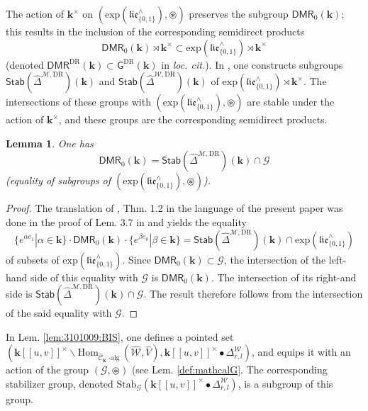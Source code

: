 \documentclass[10pt]{amsart}
\newcommand{\DR}{\mathrm{DR}}
\newtheorem{lem}[thm]{Lemma}
\numberwithin{equation}{subsection}
\begin{document}
The action of $\mathbf k^\times$ on $(\mathrm{exp}(\mathfrak{lie}_{\{0,1\}}^\wedge),\circledast)$
preserves the subgroup $\mathsf{DMR}_0(\mathbf k)$; this results in the inclusion of the corresponding 
semidirect products
$$
\mathsf{DMR}_0(\mathbf k)\rtimes\mathbf k^\times
\subset \mathrm{exp}(\mathfrak{lie}_{\{0,1\}}^\wedge)
\rtimes\mathbf k^\times
$$
(denoted $\mathsf{DMR}^\DR(\mathbf k)\subset \mathsf G^\DR(\mathbf k)$ in {\it loc. cit.}). 
In \cite{EF2}, one constructs subgroups 
$\mathsf{Stab}(\hat\Delta^{\mathcal M,\DR})(\mathbf k)$ and $\mathsf{Stab}(\hat\Delta^{\mathcal W,\DR})(\mathbf k)$ 
of $\mathrm{exp}(\mathfrak{lie}_{\{0,1\}}^\wedge)\rtimes\mathbf k^\times$. The intersections 
of these groups with $(\mathrm{exp}(\mathfrak{lie}_{\{0,1\}}^\wedge),\circledast)$ are stable under the action of 
$\mathbf k^\times$, and
these groups are the corresponding semidirect products. 

\begin{lem}\label{lem:12:2209}
One has 
$$
\mathsf{DMR}_0(\mathbf k)=\mathsf{Stab}(\hat\Delta^{\mathcal M,\DR})(\mathbf k)\cap \mathcal G
$$
(equality of subgroups of $(\mathrm{exp}(\mathfrak{lie}_{\{0,1\}}^\wedge),\circledast)$). 
\end{lem}

\begin{proof}
The translation of \cite{EF0}, Thm. 1.2 in the language of the present paper was done in the proof of 
Lem. 3.7 in \cite{EF2} and yields the equality 
$$
\{e^{\alpha e_1}|\alpha\in\mathbf k\}\cdot\mathsf{DMR}_0(\mathbf k)\cdot\{e^{\beta e_0}|\beta\in\mathbf k\}
=\mathsf{Stab}(\hat\Delta^{\mathcal M,\DR})(\mathbf k)\cap \mathrm{exp}(\mathfrak{lie}_{\{0,1\}}^\wedge)
$$
of subsets of $\mathrm{exp}(\mathfrak{lie}_{\{0,1\}}^\wedge)$. Since $\mathsf{DMR}_0(\mathbf k)
\subset\mathcal G$, the intersection of the left-hand side of this equality with $\mathcal G$ is 
$\mathsf{DMR}_0(\mathbf k)$. The intersection of its right-and side is  
$\mathsf{Stab}(\hat\Delta^{\mathcal M,\DR})(\mathbf k)\cap \mathcal G$. The result therefore follows from 
the intersection of the said equality with $\mathcal G$.  
\end{proof}

In Lem.  \ref{lem:3101009:BIS}, one defines a pointed set 
$(\mathbf k[[u,v]]^\times\backslash\mathrm{Hom}_{\hat{\mathcal C}_{\mathbf k}\operatorname{-alg}}(\hat{\mathcal W},\hat V),
\mathbf k[[u,v]]^\times\bullet\Delta^{\mathcal W}_{r,l}
)$, and equips it with an action of the group $(\mathcal G,\circledast)$ (see Lem. \ref{def:mathcalG}. 
The corresponding stabilizer group, denoted  $\mathrm{Stab}_{\mathcal G}(
\mathbf k[[u,v]]^\times\bullet\Delta^{\mathcal W}_{r,l}
)$, is a subgroup of this group.
\end{document}
